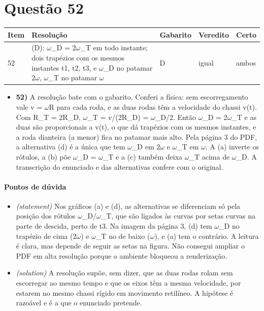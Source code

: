 \documentclass{article}%
\begin{document}
\section*{Questão 52}%
\begin{longtable}{@{}p{} p{} p{} p{} p{}@{}}\toprule Item & Resolução & Gabarito & Veredito & Certo \\ \midrule
52 & (D): $\omega$\_D = 2$\omega$\_T em todo instante; dois trapézios com os mesmos instantes t1, t2, t3, e $\omega$\_D no patamar 2$\omega$, $\omega$\_T no patamar $\omega$ & D & igual & ambos \\
\bottomrule\end{longtable}%
\begin{itemize}%
\item%
\textbf{52)} A resolução bate com o gabarito. Conferi a física: sem escorregamento vale v = $\omega$R para cada roda, e as duas rodas têm a velocidade do chassi v(t). Com R\_T = 2R\_D, $\omega$\_T = v/(2R\_D) = $\omega$\_D/2. Então $\omega$\_D = 2$\omega$\_T e as duas são proporcionais a v(t), o que dá trapézios com os mesmos instantes, e a roda dianteira (a menor) fica no patamar mais alto. Pela página 3 do PDF, a alternativa (d) é a única que tem $\omega$\_D em 2$\omega$ e $\omega$\_T em $\omega$. A (a) inverte os rótulos, a (b) põe $\omega$\_D = $\omega$\_T e a (c) também deixa $\omega$\_T acima de $\omega$\_D. A transcrição do enunciado e das alternativas confere com o original.%
\end{itemize}%
\paragraph{Pontos de dúvida}%
\begin{itemize}%
\item%
\textit{(statement)} Nos gráficos (a) e (d), as alternativas se diferenciam só pela posição dos rótulos $\omega$\_D/$\omega$\_T, que são ligados às curvas por setas curvas na parte de descida, perto de t3. Na imagem da página 3, (d) tem $\omega$\_D no trapézio de cima (2$\omega$) e $\omega$\_T no de baixo ($\omega$), e (a) tem o contrário. A leitura é clara, mas depende de seguir as setas na figura. Não consegui ampliar o PDF em alta resolução porque o ambiente bloqueou a renderização.%
\item%
\textit{(solution)} A resolução supõe, sem dizer, que as duas rodas rolam sem escorregar ao mesmo tempo e que os eixos têm a mesma velocidade, por estarem no mesmo chassi rígido em movimento retilíneo. A hipótese é razoável e é a que o enunciado pretende.%
\end{itemize}%
\end{document}
